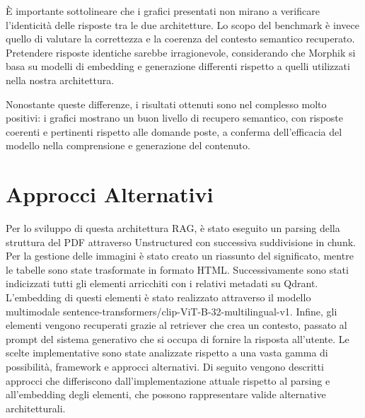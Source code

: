 È importante sottolineare che i grafici presentati non mirano a verificare l’identicità delle risposte tra le due architetture. Lo scopo del benchmark è invece quello di valutare la correttezza e la coerenza del contesto semantico recuperato. Pretendere risposte identiche sarebbe irragionevole, considerando che Morphik si basa su modelli di embedding e generazione differenti rispetto a quelli utilizzati nella nostra architettura.

Nonostante queste differenze, i risultati ottenuti sono nel complesso molto positivi: i grafici mostrano un buon livello di recupero semantico, con risposte coerenti e pertinenti rispetto alle domande poste, a conferma dell'efficacia del modello nella comprensione e generazione del contenuto.

\section{Approcci Alternativi}
Per lo sviluppo di questa architettura RAG, è stato eseguito un parsing della struttura del PDF attraverso Unstructured con successiva suddivisione in chunk. Per la gestione delle immagini è stato creato un riassunto del significato, mentre le tabelle sono state trasformate in formato HTML. Successivamente sono stati indicizzati tutti gli elementi arricchiti con i relativi metadati su Qdrant. L'embedding di questi elementi è stato realizzato attraverso il modello multimodale sentence-transformers/clip-ViT-B-32-multilingual-v1. Infine, gli elementi vengono recuperati grazie al retriever che crea un contesto, passato al prompt del sistema generativo che si occupa di fornire la risposta all'utente. Le scelte implementative sono state analizzate rispetto a una vasta gamma di possibilità, framework e approcci alternativi. Di seguito vengono descritti approcci che differiscono dall'implementazione attuale rispetto al parsing e all'embedding degli elementi, che possono rappresentare valide alternative architetturali.
